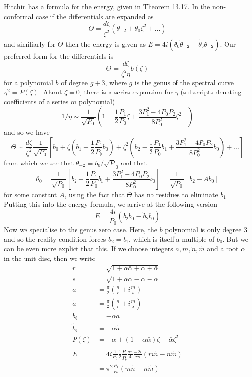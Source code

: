 \documentclass{article}
\begin{document}
Hitchin has a formula for the energy, given in Theorem 13.17. In the non-conformal case if the differentials are expanded as
\[
\Theta = \frac{d\zeta}{\zeta^2}(\theta_{-2} + \theta_0\zeta^2 + \dots)
\]
and similiarly for $\tilde \Theta$ then the energy is given as $E = 4i(\theta_0 \tilde \theta_{-2} - \tilde \theta_0 \theta_{-2})$. Our preferred form for the differentials is
\[
  \Theta = \frac{d\zeta}{\zeta^2\eta}b(\zeta)
\]
for a polynomial $b$ of degree $g+3$, where $g$ is the genus of the spectral curve $\eta^2 = P(\zeta)$. About $\zeta=0$, there is a series expansion for $\eta$ (subscripts denoting coefficients of a series or polynomial)
\[
  1/\eta \sim \frac{1}{\sqrt{P_0}}\left(1 - \frac{1}{2}\frac{P_1}{P_0}\zeta + \frac{3P_1^2 - 4P_0P_2}{8P_0^2}\zeta^2\dots\right)
\]
and so we have
\[
  \Theta \sim \frac{d\zeta}{\zeta^2}\frac{1}{\sqrt{P_0}}\left[ b_0 + \zeta\left( b_1 - \frac{1}{2}\frac{P_1}{P_0}b_0 \right) + \zeta^2\left( b_2 - \frac{1}{2}\frac{P_1}{P_0}b_1 + \frac{3P_1^2 - 4P_0P_2}{8P_0^2}b_0 \right) + \dots\right]
\]
from which we see that $\theta_{-2} = b_0 / \sqrt P_0$ and that
\[
  \theta_0 = \frac{1}{\sqrt{P_0}}\left[b_2 - \frac{1}{2}\frac{P_1}{P_0}b_1 + \frac{3P_1^2 - 4P_0P_2}{8P_0^2}b_0\right] = \frac{1}{\sqrt{P_0}}\left[b_2 - A b_0\right]
\]
for some constant $A$, using the fact that $\Theta$ has no residues to eliminate $b_1$. Putting this into the energy formula, we arrive at the following version
\[
  E = \frac{4i}{P_0} (b_2 \tilde b_0 - \tilde b_2 b_0)
\]
Now we specialise to the genus zero case. Here, the $b$ polynomial is only degree $3$ and so the reality condition forces $b_2 = \bar b_1$, which is itself a multiple of $\bar b_0$. But we can be even more explict that this. If we choose integers $n,m,\tilde n, \tilde m$ and a root $\alpha$ in the unit disc, then we write
\begin{align*}
r &= \sqrt{ 1 + \alpha\bar \alpha + \alpha + \bar \alpha} \\
s &= \sqrt{ 1 + \alpha\bar \alpha - \alpha - \bar \alpha} \\
a &= \frac{\pi}{2}\left( \frac{n}{r} + i\frac{m}{s} \right) \\
\tilde a &= \frac{\pi}{2}\left( \frac{\tilde n}{r} + i\frac{\tilde m}{s} \right)\\
b_0 &= - \alpha \bar a \\
\tilde b_0 &= - \alpha \bar{\tilde a} \\
P(\zeta) &= -\alpha + (1+\alpha\bar \alpha)\zeta - \bar \alpha\zeta^2 \\
& \\
E &= 4i \frac{1}{P_0}\frac{1}{2}\frac{P_1}{\overline P_0}\frac{\pi^2}{4}\frac{-2i}{rs}(m\tilde n - n\tilde m) \\
&= \pi^2\frac{P_1}{rs}(m\tilde n - n\tilde m)
\end{align*}
\end{document}
